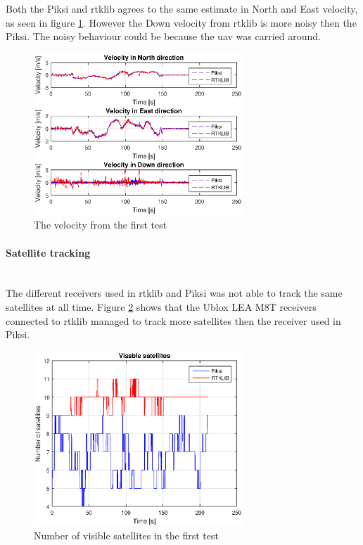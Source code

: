 Both the Piksi and \gls{rtklib} agrees to the same estimate in North and East velocity, as seen in figure \ref{figure:VelocityWalk1}. However the Down velocity from \gls{rtklib} is more noisy then the Piksi. The noisy behaviour could be because the \gls{uav} was carried around.
\begin{figure}[H]
	\centering
		\includegraphics[width=0.7\textwidth]{figs/plots/velocityWalk1.eps}
		\caption{The velocity from the first test}
		\label{figure:VelocityWalk1}
\end{figure}
\paragraph{Satellite tracking}~\\

The different receivers used in \gls{rtklib} and Piksi was not able to track the same satellites at all time. Figure \ref{figure:NumSatWalk1} shows that the Ublox LEA M8T receivers connected to \gls{rtklib} managed to track more satellites then the receiver used in Piksi. 
\begin{figure}[H]
	\centering
		\includegraphics[width=0.7\textwidth]{figs/plots/numSatWalk1.eps}
		\caption{Number of visible satellites in the first test}
		\label{figure:NumSatWalk1}
\end{figure}
